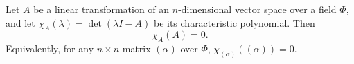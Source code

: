 Let $A$ be a linear transformation of an $n$-dimensional vector space over a field $\Phi$, and let $\chi_A(\lambda) = \det(\lambda I - A)$ be its characteristic polynomial. Then
$$\chi_A(A) = 0.$$
Equivalently, for any $n \times n$ matrix $(\alpha)$ over $\Phi$, $\chi_{(\alpha)}((\alpha)) = 0$.
